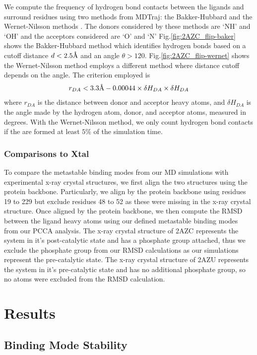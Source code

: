 \documentclass[fleqn,10pt]{wlscirep}
\newcommand{\angstrom}{\text{\normalfont\AA}}
\begin{document}
We compute the frequency of hydrogen bond contacts between the ligands and surround residues using two methods from MDTraj: the Bakker-Hubbard \cite{} and the Wernet-Nilsson methods \cite{}.
The donors considered by these methods are `NH' and `OH' and the acceptors considered are `O' and `N' 
Fig.\ref{fig:2AZC_flip-baker} shows the Bakker-Hubbard method which identifies hydrogen bonds based on a cutoff distance $d<2.5\angstrom$ and an angle $\theta>120$.
Fig.\ref{fig:2AZC_flip-wernet} shows the Wernet-Nilsson method employs a different method where distance cutoff depends on the angle.
The criterion employed is 
\begin{equation}
r_{DA}<3.3\angstrom - 0.00044 \times \delta{H_{DA}} \times \delta{H_{DA}}
\end{equation} where $r_{DA}$ is the distance between donor and acceptor heavy atoms, and $\delta{H_{DA}}$ is the angle made by the hydrogen atom, donor, and acceptor atoms, measured in degrees.
With the Wernet-Nilsson method, we only count hydrogen bond contacts if the are formed at least $5\%$ of the simulation time.


\subsubsection{Comparisons to Xtal}
To compare the metastable binding modes from our MD simulations with experimental x-ray crystal structures, we first align the two structures using the protein backbone.
Particularly, we align by the protein backbone using residues 19 to 229 but exclude residues 48 to 52 as these were missing in the x-ray crystal structure.
Once aligned by the protein backbone, we then compute the RMSD between the ligand heavy atoms using our defined metastable binding modes from our PCCA analysis.
The x-ray crystal structure of 2AZC represents the system in it's post-catalytic state and has a phosphate group attached, thus we exclude the phosphate group from our RMSD calculations as our simulations represent the pre-catalytic state.
The x-ray crystal structure of 2AZU represents the system in it's pre-catalytic state and has no additional phosphate group, so no atoms were excluded from the RMSD calculation.


\section{Results}

\subsection{Binding Mode Stability}
\end{document}
